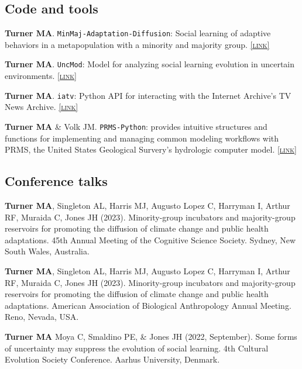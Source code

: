 \documentclass[11pt, letterpaper]{article}
\newcommand{\lurl}[1]{\href{#1}{\scriptsize\textsc{[link]}}}
\begin{document}
\subsection{Code and tools}

\textbf{Turner MA}. \texttt{MinMaj-Adaptation-Diffusion}: Social learning of adaptive behaviors in a
metapopulation with a minority and majority group.
\lurl{https://github.com/eehh-stanford/MinMaj-Adaptation-Diffusion}

\textbf{Turner MA}. \texttt{UncMod}: Model for analyzing social learning evolution in uncertain
environments. \lurl{https://github.com/mt-digital/UncMod}

\textbf{Turner MA}. \texttt{iatv}: Python API for interacting with the Internet
Archive's TV News Archive. \lurl{https://github.com/mt-digital/iatv}


\textbf{Turner MA} \& Volk JM. \texttt{PRMS-Python}: provides intuitive
structures and functions for implementing and managing common modeling
workflows with PRMS, the United States Geological Survery’s hydrologic computer
model. \lurl{https://prms-python.github.io/PRMS-Python/build/html/index.html}

\subsection{Conference talks}

    \textbf{Turner MA}, Singleton AL, Harris MJ, Augusto Lopez C, Harryman I,
    Arthur RF, Muraida C, Jones JH (2023). Minority-group incubators and majority-group reservoirs for promoting the diffusion of climate change and public health adaptations. 45th Annual Meeting of the Cognitive Science Society.
    Sydney, New South Wales, Australia.

    \textbf{Turner MA}, Singleton AL, Harris MJ, Augusto Lopez C, Harryman I,
    Arthur RF, Muraida C, Jones JH (2023). Minority-group incubators and majority-group reservoirs for promoting the diffusion of climate change and
    public health adaptations. American Association of Biological Anthropology
    Annual Meeting. Reno, Nevada, USA.

    \textbf{Turner MA} Moya C, Smaldino PE, \& Jones JH (2022, September). Some forms of
    uncertainty may suppress the evolution of social learning. 4th Cultural Evolution Society
    Conference. Aarhus University, Denmark. 
\end{document}
